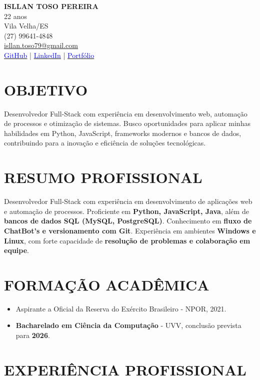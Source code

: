 \documentclass[a4paper,10pt]{article}
\begin{document}
\begin{center}
    {\LARGE \textbf{ISLLAN TOSO PEREIRA}} \\
    22 anos \\
    Vila Velha/ES \\
    (27) 99641-4848 \\
    \href{mailto:isllan.toso79@gmail.com}{isllan.toso79@gmail.com} \\
    \href{https://github.com/Isllanrx}{\textcolor{blue}{GitHub}} | 
    \href{http://linkedin.com/in/isllantoso}{\textcolor{blue}{LinkedIn}} | 
    \href{https://port-isllan.vercel.app/}{\textcolor{blue}{Portfólio}}
\end{center} 

\section{OBJETIVO}
Desenvolvedor Full-Stack com experiência em desenvolvimento web, automação de processos e otimização de sistemas. Busco oportunidades para aplicar minhas habilidades em Python, JavaScript, frameworks modernos e bancos de dados, contribuindo para a inovação e eficiência de soluções tecnológicas.

\section{RESUMO PROFISSIONAL}
Desenvolvedor Full-Stack com experiência em desenvolvimento de aplicações web e automação de processos. Proficiente em \textbf{Python, JavaScript, Java}, além de \textbf{bancos de dados SQL (MySQL, PostgreSQL)}. Conhecimento em \textbf{fluxo de ChatBot’s e versionamento com Git}. Experiência em ambientes \textbf{Windows e Linux}, com forte capacidade de \textbf{resolução de problemas e colaboração em equipe}.

\section{FORMAÇÃO ACADÊMICA}
\begin{itemize}
    \item Aspirante a Oficial da Reserva do Exército Brasileiro - NPOR, 2021.
    \item \textbf{Bacharelado em Ciência da Computação} - UVV, conclusão prevista para \textbf{2026}.
\end{itemize}

\section{EXPERIÊNCIA PROFISSIONAL}
\end{document}
